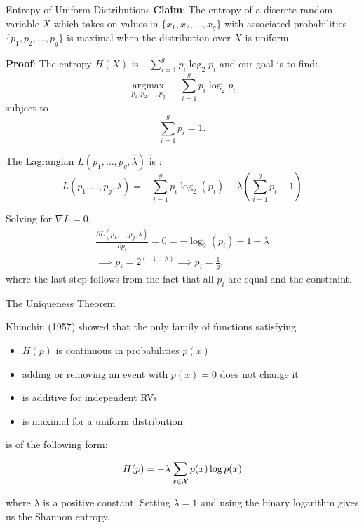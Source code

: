 \begin{vbframe}{Entropy of Uniform Distributions}
\textbf{Claim}: The entropy of a discrete random variable $X$ which takes on values in $\{x_1,x_2, \ldots, x_g\}$ with associated probabilities $\{p_1,p_2, \ldots, p_g\}$ is maximal when the distribution over $X$ is uniform.

\lz
\textbf{Proof}: The entropy $H(X)$ is $- \sum_{i=1}^g p_i \log_2 p_i$ and our goal is to find:
  $$\underset{p_{1}, p_{2}, \ldots, p_{g}}{\operatorname{argmax}}-\sum_{i=1}^{g} p_{i} \log _{2} p_{i}$$
  subject to
  $$\sum_{i=1}^g p_i = 1.$$
  
  \framebreak
  The Lagrangian $L(p_1, \ldots, p_g, \lambda)$ is :
  $$L(p_1, \ldots, p_g, \lambda) = - \sum_{i=1}^g p_i \log_2(p_i) - \lambda \left( \sum_{i=1}^g p_i - 1 \right)$$
  
  Solving for $\nabla L = 0$,
  \begin{gather*}
    \frac{\partial L(p_1, \ldots, p_g, \lambda)}{\partial p_i} = 0 = - \log_2(p_i) - 1 - \lambda \\
    \implies p_i = 2^{(-1 - \lambda)} \implies p_i = \frac{1}{g},
  \end{gather*}
  where the last step follows from the fact that all $p_i$ are equal and the constraint.

\end{vbframe}

\begin{vbframe}{The Uniqueness Theorem}

Khinchin (1957) showed that the only family of functions satisfying
\begin{itemize}
  \item $H(p)$ is continuous in probabilities $p(x)$
  \item adding or removing an event with $p(x)=0$ does not change it
  \item is additive for independent RVs
  \item is maximal for a uniform distribution.
\end{itemize}

is of the following form:

$$ H(p) = - \lambda \sum_{x \in \mathcal{X}} p(x) \log p(x) $$ 

where $\lambda$ is a positive constant. Setting $\lambda = 1$ and using the binary logarithm gives us the Shannon entropy.
\end{vbframe}


\endlecture


